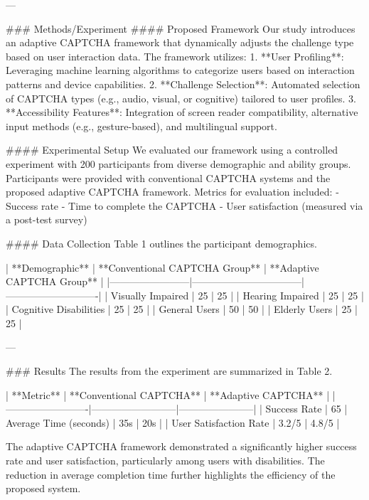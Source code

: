 ---

### Methods/Experiment
#### Proposed Framework
Our study introduces an adaptive CAPTCHA framework that dynamically adjusts the challenge type based on user interaction data. The framework utilizes:
1. **User Profiling**: Leveraging machine learning algorithms to categorize users based on interaction patterns and device capabilities.
2. **Challenge Selection**: Automated selection of CAPTCHA types (e.g., audio, visual, or cognitive) tailored to user profiles.
3. **Accessibility Features**: Integration of screen reader compatibility, alternative input methods (e.g., gesture-based), and multilingual support.

#### Experimental Setup
We evaluated our framework using a controlled experiment with 200 participants from diverse demographic and ability groups. Participants were provided with conventional CAPTCHA systems and the proposed adaptive CAPTCHA framework. Metrics for evaluation included:
- Success rate
- Time to complete the CAPTCHA
- User satisfaction (measured via a post-test survey)

#### Data Collection
Table 1 outlines the participant demographics. 

| **Demographic**       | **Conventional CAPTCHA Group** | **Adaptive CAPTCHA Group** |
|------------------------|---------------------------------|----------------------------|
| Visually Impaired      | 25                              | 25                         |
| Hearing Impaired       | 25                              | 25                         |
| Cognitive Disabilities | 25                              | 25                         |
| General Users          | 50                              | 50                         |
| Elderly Users          | 25                              | 25                         |

---

### Results
The results from the experiment are summarized in Table 2.

| **Metric**             | **Conventional CAPTCHA** | **Adaptive CAPTCHA** |
|-------------------------|--------------------------|-----------------------|
| Success Rate           | 65%
| Average Time (seconds) | 35s                      | 20s                  |
| User Satisfaction Rate | 3.2/5                    | 4.8/5                |

The adaptive CAPTCHA framework demonstrated a significantly higher success rate and user satisfaction, particularly among users with disabilities. The reduction in average completion time further highlights the efficiency of the proposed system.

